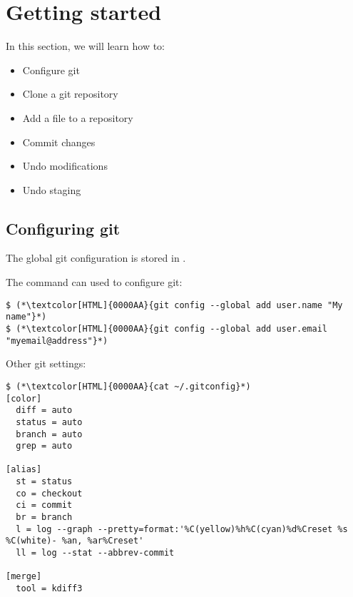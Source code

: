 \section{Getting started}
\begin{frame}[fragile]
  \slidetitle

  In this section, we will learn how to:
  \begin{itemize}
    \item Configure git
    \item Clone a git repository
    \item Add a file to a repository
    \item Commit changes
    \item Undo modifications
    \item Undo staging
  \end{itemize}
\end{frame}

\subsection{Configuring git}
\begin{frame}[fragile]
  \subslidetitle
  The global git configuration is stored in .
  \\
  \vspace{1em}

  The command  can used to configure git:
  \begin{lstlisting}
$ (*\textcolor[HTML]{0000AA}{git config --global add user.name "My name"}*)
$ (*\textcolor[HTML]{0000AA}{git config --global add user.email "myemail@address"}*)
\end{lstlisting}

  Other git settings:
  \begin{lstlisting}[basicstyle=\small\ttfamily\bfseries]
$ (*\textcolor[HTML]{0000AA}{cat ~/.gitconfig}*)
[color]
  diff = auto
  status = auto
  branch = auto
  grep = auto

[alias]
  st = status
  co = checkout
  ci = commit
  br = branch
  l = log --graph --pretty=format:'%C(yellow)%h%C(cyan)%d%Creset %s %C(white)- %an, %ar%Creset'
  ll = log --stat --abbrev-commit

[merge]
  tool = kdiff3
  \end{lstlisting}
\end{frame}

